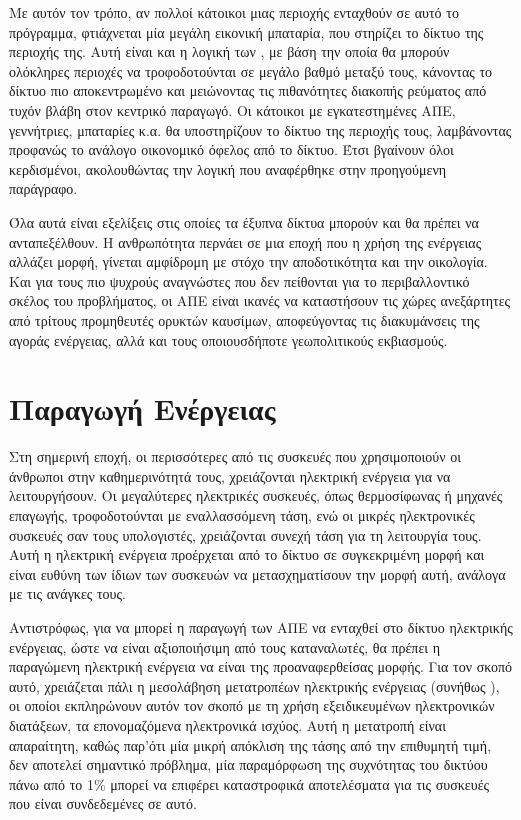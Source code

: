 \documentclass[12pt]{report}
\begin{document}
Με αυτόν τον τρόπο, αν πολλοί κάτοικοι μιας περιοχής ενταχθούν σε αυτό το πρόγραμμα, φτιάχνεται μία μεγάλη εικονική μπαταρία, που στηρίζει το δίκτυο της περιοχής της. Αυτή είναι και η λογική των {}, με βάση την
οποία θα μπορούν ολόκληρες περιοχές να τροφοδοτούνται σε μεγάλο βαθμό μεταξύ τους, κάνοντας το δίκτυο πιο αποκεντρωμένο και μειώνοντας τις πιθανότητες διακοπής ρεύματος από τυχόν βλάβη στον κεντρικό παραγωγό. Οι κάτοικοι με
εγκατεστημένες ΑΠΕ, γεννήτριες, μπαταρίες κ.α. θα υποστηρίζουν το δίκτυο της περιοχής τους, λαμβάνοντας προφανώς το ανάλογο οικονομικό όφελος από το δίκτυο. Έτσι βγαίνουν όλοι κερδισμένοι, ακολουθώντας την λογική που αναφέρθηκε 
στην προηγούμενη παράγραφο.

Όλα αυτά είναι εξελίξεις στις οποίες τα έξυπνα δίκτυα μπορούν και θα πρέπει να ανταπεξέλθουν. Η ανθρωπότητα περνάει σε μια εποχή που η χρήση της ενέργειας αλλάζει μορφή, γίνεται αμφίδρομη με στόχο την αποδοτικότητα και την οικολογία.
Και για τους πιο ψυχρούς αναγνώστες που δεν πείθονται για το περιβαλλοντικό σκέλος του προβλήματος, οι ΑΠΕ είναι ικανές να καταστήσουν τις χώρες ανεξάρτητες από τρίτους προμηθευτές ορυκτών καυσίμων, αποφεύγοντας τις διακυμάνσεις της 
αγοράς ενέργειας, αλλά και τους οποιουσδήποτε γεωπολιτικούς εκβιασμούς.
\chapter{Παραγωγή Ενέργειας}
Στη σημερινή εποχή, οι περισσότερες από τις συσκευές που χρησιμοποιούν οι άνθρωποι στην καθημερινότητά τους, χρειάζονται ηλεκτρική ενέργεια για να λειτουργήσουν. Οι μεγαλύτερες ηλεκτρικές συσκευές, όπως θερμοσίφωνας ή μηχανές
επαγωγής, τροφοδοτούνται με εναλλασσόμενη τάση, ενώ οι μικρές ηλεκτρονικές συσκευές σαν τους υπολογιστές, χρειάζονται συνεχή τάση για τη λειτουργία τους. Αυτή η ηλεκτρική ενέργεια προέρχεται από το δίκτυο σε συγκεκριμένη μορφή
{} και είναι ευθύνη των ίδιων των συσκευών να μετασχηματίσουν την μορφή αυτή, ανάλογα με τις ανάγκες τους.

Αντιστρόφως, για να μπορεί η παραγωγή των ΑΠΕ να ενταχθεί στο δίκτυο ηλεκτρικής ενέργειας, ώστε να είναι αξιοποιήσιμη από τους καταναλωτές, θα πρέπει η παραγώμενη ηλεκτρική ενέργεια να είναι της προαναφερθείσας μορφής. Για τον σκοπό 
αυτό, χρειάζεται πάλι η μεσολάβηση μετατροπέων ηλεκτρικής ενέργειας (συνήθως {}), οι οποίοι εκπληρώνουν αυτόν τον σκοπό με τη χρήση εξειδικευμένων ηλεκτρονικών διατάξεων, τα επονομαζόμενα ηλεκτρονικά ισχύος. Αυτή 
η μετατροπή είναι απαραίτητη, καθώς παρ'ότι μία μικρή απόκλιση της τάσης από την επιθυμητή τιμή, δεν αποτελεί σημαντικό πρόβλημα, μία παραμόρφωση της συχνότητας του δικτύου πάνω από το 1\% μπορεί να επιφέρει καταστροφικά αποτελέσματα
για τις συσκευές που είναι συνδεδεμένες σε αυτό. 
\end{document}
